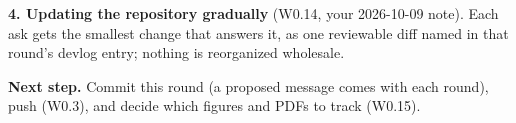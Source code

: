 \textbf{4. Updating the repository gradually} (W0.14, your 2026-10-09 note). Each ask gets the smallest change that answers it, as one reviewable diff named in that round's devlog entry; nothing is reorganized wholesale.

\textbf{Next step.} Commit this round (a proposed message comes with each round), push (W0.3), and decide which figures and PDFs to track (W0.15).
